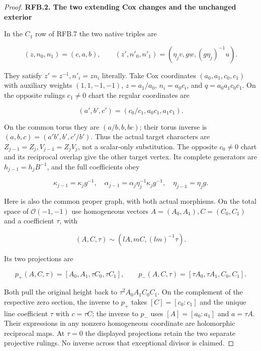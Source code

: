 \begin{proof}
\par

\medskip\noindent\textbf{RFB.2. The two extending Cox changes and the unchanged exterior}

\par\nobreak

In the \(C_1\) row of RFB.7 the two native triples are

\[
 (z,n_0,n_1)=(c,a,b),\qquad
 (z',n'_0,n'_1)=(\eta_jv,gw,(g\eta_j)^{-1}u).
 \tag{RFB.12}
\]

They satisfy \(z'=z^{-1},n'_i=zn_i\) literally. Take Cox
coordinates \((a_0,a_1,c_0,c_1)\) with auxiliary weights
\((1,1,-1,-1)\), \(z=a_1/a_0\), \(n_i=a_0c_i\), and
\(q=a_0a_1c_0c_1\). On the opposite ruling\textquotesingle s \(c_1\ne0\)
chart the regular coordinates are

\[
 (a',b',c')=(c_0/c_1,a_0c_1,a_1c_1).
 \tag{RFB.13}
\]

On the common torus they are \((a/b,b,bc)\); their torus inverse
is \((a,b,c)=(a'b',b',c'/b')\). Thus the actual target characters
are \(Z_{j-1}=Z_j,V_{j-1}=Z_jV_j\), not a scalar-only substitution.
The opposite \(c_0\ne0\) chart and its reciprocal overlap give the
other target vertex. Its complete generators are \(h_{j-1}=h_jB^{-1}\),
and the full coefficients obey

\[
 \kappa_{j-1}=\kappa_jg^{-1},\quad
 \alpha_{j-1}=\alpha_j\eta_j^{-1}\kappa_jg^{-1},\quad
 \eta_{j-1}=\eta_jg .
 \tag{RFB.14}
\]

Here is also the common proper graph, with both actual morphisms.
On the total space of \(\mathcal O(-1,-1)\) use homogeneous vectors
\(A=(A_0,A_1),C=(C_0,C_1)\) and a coefficient \(\tau\), with

\[
 (A,C,\tau)\sim(lA,mC,(lm)^{-1}\tau).
\]

Its two projections are

\[
 p_+(A,C,\tau)=[A_0,A_1,\tau C_0,\tau C_1],\qquad
 p_-(A,C,\tau)=[\tau A_0,\tau A_1,C_0,C_1].
 \tag{RFB.15}
\]

Both pull the original height back to
\(\tau^2A_0A_1C_0C_1\). On the complement of the respective
zero section, the inverse to \(p_+\) takes
\([C]=[c_0:c_1]\) and the unique line coefficient \(\tau\)
with \(c=\tau C\); the inverse to \(p_-\) uses
\([A]=[a_0:a_1]\) and \(a=\tau A\). Their expressions in any
nonzero homogeneous coordinate are holomorphic reciprocal maps.
At \(\tau=0\) the displayed projections retain the two separate
projective rulings. No inverse across that exceptional divisor is
claimed.


\end{proof}
